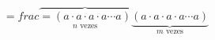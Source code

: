 \documentclass[preview]{standalone}
\begin{document}
\begin{align*}
=frac{\overbrace{=(a \cdot a \cdot a \cdot a \cdots a)}_{n \text{ vezes}}}{ \underbrace{(a \cdot a \cdot a \cdot a \cdots a)}_{m \text{ vezes}}}
\end{align*}
\end{document}
